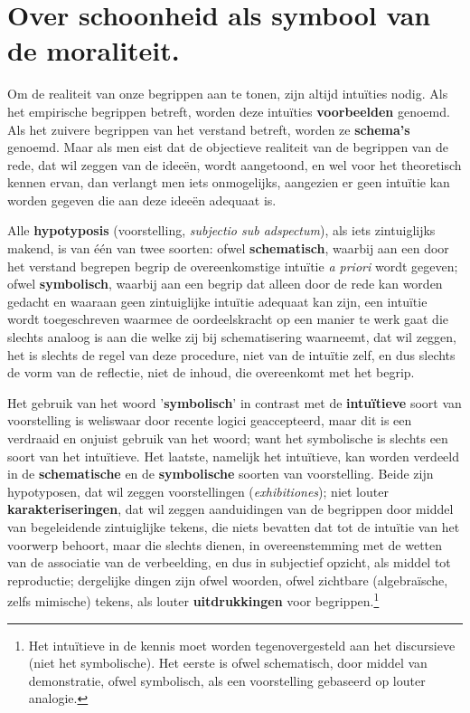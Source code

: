 \section{Over schoonheid als symbool van de moraliteit.}

Om de realiteit van onze begrippen aan te tonen, zijn altijd intuïties nodig. Als het empirische begrippen betreft, worden deze intuïties \textbf{voorbeelden} genoemd. Als het zuivere begrippen van het verstand betreft, worden ze \textbf{schema's} genoemd. Maar als men eist dat de objectieve realiteit van de begrippen van de rede, dat wil zeggen van de ideeën, wordt aangetoond, en wel voor het theoretisch kennen ervan, dan verlangt men iets onmogelijks, aangezien er geen intuïtie kan worden gegeven die aan deze ideeën adequaat is.

Alle \textbf{hypotyposis} (voorstelling, \textit{subjectio sub adspectum}), als iets zintuiglijks makend, is van één van twee soorten: ofwel \textbf{schematisch}, waarbij aan een door het verstand begrepen begrip de overeenkomstige intuïtie \textit{a priori} wordt gegeven; ofwel \textbf{symbolisch}, waarbij aan een begrip dat alleen door de rede kan worden gedacht en waaraan geen zintuiglijke intuïtie adequaat kan zijn, een intuïtie wordt toegeschreven waarmee de oordeelskracht op een manier te werk gaat die slechts analoog is aan die welke zij bij schematisering waarneemt, dat wil zeggen, het is slechts de regel van deze procedure, niet van de intuïtie zelf, en dus slechts de vorm van de reflectie, niet de inhoud, die overeenkomt met het begrip.

Het gebruik van het woord '\textbf{symbolisch}' in contrast met de \textbf{intuïtieve} soort van voorstelling is weliswaar door recente logici geaccepteerd, maar dit is een verdraaid en onjuist gebruik van het woord; want het symbolische is slechts een soort van het intuïtieve. Het laatste, namelijk het intuïtieve, kan worden verdeeld in de \textbf{schematische} en de \textbf{symbolische} soorten van voorstelling. Beide zijn hypotyposen, dat wil zeggen voorstellingen (\textit{exhibitiones}); niet louter \textbf{karakteriseringen}, dat wil zeggen aanduidingen van de begrippen door middel van begeleidende zintuiglijke tekens, die niets bevatten dat tot de intuïtie van het voorwerp behoort, maar die slechts dienen, in overeenstemming met de wetten van de associatie van de verbeelding, en dus in subjectief opzicht, als middel tot reproductie; dergelijke dingen zijn ofwel woorden, ofwel zichtbare (algebraïsche, zelfs mimische) tekens, als louter \textbf{uitdrukkingen} voor begrippen.\footnote{Het intuïtieve in de kennis moet worden tegenovergesteld aan het discursieve (niet het symbolische). Het eerste is ofwel schematisch, door middel van demonstratie, ofwel symbolisch, als een voorstelling gebaseerd op louter analogie.}

